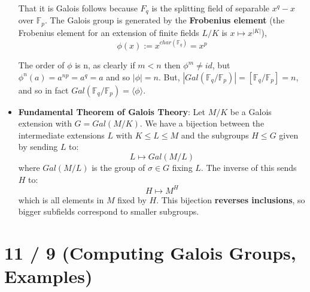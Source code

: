 \documentclass[11pt, oneside]{amsart}   	%
\theoremstyle{definition}
\begin{document}
\begin{itemize}
	That it is Galois follows because $F_q$ is the splitting field of separable $x^q - x$ over $\mathbb F_p$. The Galois group is generated by the 
	\textbf{Frobenius element} (the Frobenius element for an extension of finite fields $L / K$ is $x\mapsto x^{|K|}$),
	$$
		\phi(x) := x^{char(\mathbb F_q)} = x^p
	$$
	
	The order of $\phi$ is n, as clearly if $m < n$ then $\phi^m\neq id$, but $\phi^n(a) = a^{np} = a^q = a$ and so $|\phi| = n$. But, $|Gal(\mathbb F_q / 
	\mathbb F_p)| = [\mathbb F_q / \mathbb F_p] = n$, and so in fact $Gal(\mathbb F_q / \mathbb F_p) = \langle \phi\rangle$.
	
	\item \textbf{Fundamental Theorem of Galois Theory}: Let $M / K$ be a Galois extension with $G = Gal(M / K)$. We have a bijection between the 
	intermediate extensions $L$ with $K \leq L \leq M$ and the subgroups $H\leq G$ given by sending $L$ to:
	$$
		L\mapsto Gal(M / L)
	$$
	where $Gal(M / L)$ is the group of $\sigma\in G$ fixing $L$. The inverse of this sends $H$ to:
	$$
		H\mapsto M^H
	$$
	which is all elements in $M$ fixed by $H$. This bijection \textbf{reverses inclusions}, so bigger subfields correspond to smaller subgroups.

\end{itemize}

\section{11 / 9 (Computing Galois Groups, Examples)}
\end{document}
